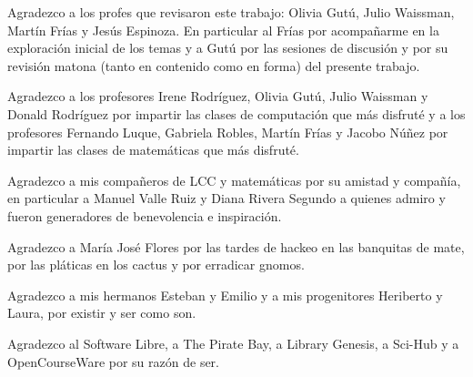 Agradezco a los profes que revisaron este trabajo: Olivia Gutú, Julio Waissman, Martín Frías y Jesús Espinoza. En particular al Frías por acompañarme en la exploración inicial de los temas y a Gutú por las sesiones de discusión y por su revisión matona (tanto en contenido como en forma) del presente trabajo.

Agradezco a los profesores Irene Rodríguez, Olivia Gutú, Julio Waissman y Donald Rodríguez por impartir las clases de computación que más disfruté y a los profesores Fernando Luque, Gabriela Robles, Martín Frías y Jacobo Núñez por impartir las clases de matemáticas que más disfruté.

Agradezco a mis compañeros de LCC y matemáticas por su amistad y compañía, en particular a Manuel Valle Ruiz y Diana Rivera Segundo a quienes admiro y fueron generadores de benevolencia e inspiración.

Agradezco a María José Flores por las tardes de hackeo en las banquitas de mate, por las pláticas en los cactus y por erradicar gnomos.

Agradezco a mis hermanos Esteban y Emilio y a mis progenitores Heriberto y Laura, por existir y ser como son.

\bigskip

Agradezco al Software Libre, a The Pirate Bay, a Library Genesis, a Sci-Hub y a OpenCourseWare por su razón de ser.

